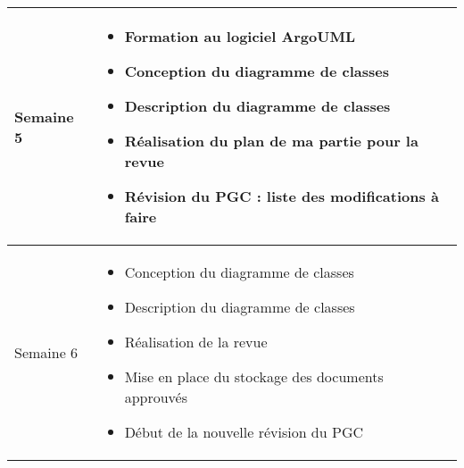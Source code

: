 \documentclass [a4paper] {article}
\begin{document}
\section*{\Mathieu}

\begin{tabularx}{16.8cm}{|>{\columncolor{gray!40}}l|X|}
	\hline
	Semaine 5 & 
	\begin{itemize}
		\item Formation au logiciel ArgoUML
		\item Conception du diagramme de classes
		\item Description du diagramme de classes
		\item Réalisation du plan de ma partie pour la revue
		\item Révision du PGC : liste des modifications à faire
	\end{itemize} \\
	\hline
	Semaine 6 & 
	\begin{itemize}
		\item Conception du diagramme de classes
		\item Description du diagramme de classes
		\item Réalisation de la revue
		\item Mise en place du stockage des documents approuvés
		\item Début de la nouvelle révision du PGC
	\end{itemize} \\
	\hline
\end{tabularx}
\end{document}
